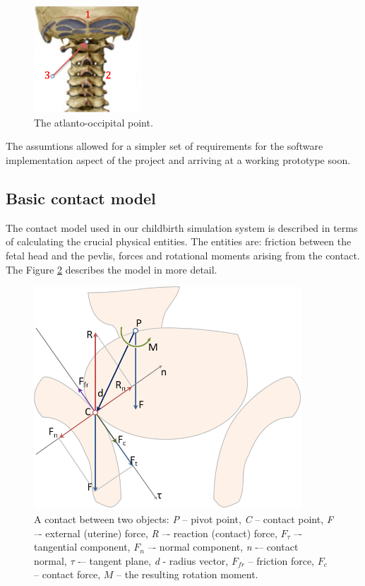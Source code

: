   \begin{figure}
  \begin{center}
  \includegraphics[width=40mm]{sections/methodology/images/basic/ao-point.png}
  \caption[The atlanto-occipital point.]{\label{contact} The atlanto-occipital point.}
  \end{center}
  \end{figure}

  The assumtions allowed for a simpler set of requirements for the software implementation aspect of the project and arriving at a working prototype soon.

\subsection{Basic contact model}

The contact model used in our childbirth simulation system is described in terms of calculating the crucial physical entities. The entities are: friction between the fetal head and the pevlis, forces and rotational moments arising from the contact. The Figure \ref{contact} describes the model in more detail.

\begin{figure}
\begin{center}
\includegraphics[width=100mm]{sections/methodology/images/basic/contact.png}
\caption[A contact between two objects.]{\label{contact} A contact between two objects: \emph{P} -- pivot point, \emph{C} -- contact point,  \emph{F} –- external (uterine) force, \emph{R} –- reaction (contact) force, $F_\tau$ –- tangential component, $F_n$ –- normal component, \emph{n} -– contact normal, $\tau$ -– tangent plane, \emph{d} - radius vector, $F_{fr}$ -- friction force, $F_{c}$ -- contact force, $M$ -- the resulting rotation moment.}
\end{center}
\end{figure}

